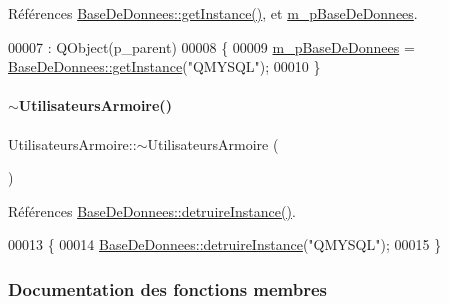 Références \hyperlink{class_base_de_donnees_a80028aa2b6b4fbf30fb2e36357b7d3d3}{Base\+De\+Donnees\+::get\+Instance()}, et \hyperlink{class_utilisateurs_armoire_ac43b4894f5036117d044ad2d22b09318}{m\+\_\+p\+Base\+De\+Donnees}.


\begin{DoxyCode}
00007                                                           : QObject(p\_parent)
00008 \{
00009     \hyperlink{class_utilisateurs_armoire_ac43b4894f5036117d044ad2d22b09318}{m\_pBaseDeDonnees} = \hyperlink{class_base_de_donnees_a80028aa2b6b4fbf30fb2e36357b7d3d3}{BaseDeDonnees::getInstance}(\textcolor{stringliteral}{"QMYSQL"});
00010 \}
\end{DoxyCode}
\mbox{\label{class_utilisateurs_armoire_a980367259be2684f8f0762ea80deb9d9}} 
\paragraph{\texorpdfstring{$\sim$\+Utilisateurs\+Armoire()}{~UtilisateursArmoire()}}
{\footnotesize\ttfamily Utilisateurs\+Armoire\+::$\sim$\+Utilisateurs\+Armoire (\begin{DoxyParamCaption}{ }\end{DoxyParamCaption})}



Références \hyperlink{class_base_de_donnees_a457401c0816b888c77ce915997545f4e}{Base\+De\+Donnees\+::detruire\+Instance()}.


\begin{DoxyCode}
00013 \{
00014     \hyperlink{class_base_de_donnees_a457401c0816b888c77ce915997545f4e}{BaseDeDonnees::detruireInstance}(\textcolor{stringliteral}{"QMYSQL"});
00015 \}
\end{DoxyCode}


\subsubsection{Documentation des fonctions membres}
\mbox{\label{class_utilisateurs_armoire_a5fd8e356a1fffd330f47935dfb843e6a}} 
